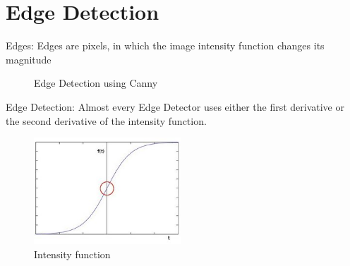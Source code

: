 \documentclass{beamer}
\begin{document}
\section{Edge Detection}
\begin{frame}
		\begin{block}{Edges:}
			Edges are pixels, in which the image intensity function changes its
			magnitude
		\end{block}
	\begin{figure} 
		\caption{Edge Detection using Canny} 
		\end{figure}
\end{frame}

\begin{frame}
	\begin{block}{Edge Detection:}
		Almost every Edge Detector uses either the first derivative or the second derivative of the intensity function. 
	\end{block}
	\begin{figure} 
		\includegraphics[width=0.49\textwidth]{edge3.jpg}
		\caption{Intensity function} 
	\end{figure}
\end{frame}
\end{document}
